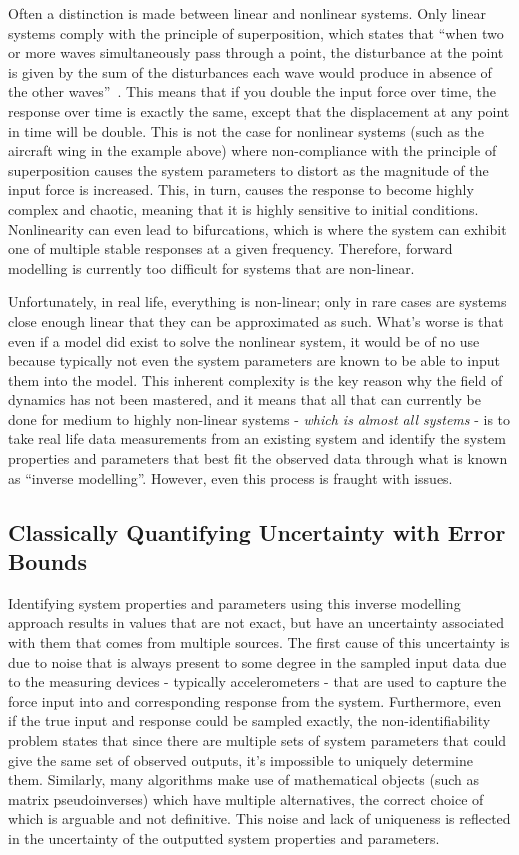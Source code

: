 \documentclass[12pt]{article}
\begin{document}
    Often a distinction is made between linear and nonlinear systems.
    Only linear systems comply with the principle of superposition, which states that ``when two or more waves simultaneously pass through a point, the disturbance at the point is given by the sum of the disturbances each wave would produce in absence of the other waves''~\cite{StudyComSuperposition}.
    This means that if you double the input force over time, the response over time is exactly the same, except that the displacement at any point in time will be double.
    This is not the case for nonlinear systems (such as the aircraft wing in the example above) where non-compliance with the principle of superposition causes the system parameters to distort as the magnitude of the input force is increased.
    This, in turn, causes the response to become highly complex and chaotic, meaning that it is highly sensitive to initial conditions.
    Nonlinearity can even lead to bifurcations, which is where the system can exhibit one of multiple stable responses at a given frequency.
    Therefore, forward modelling is currently too difficult for systems that are non-linear.

    Unfortunately, in real life, everything is non-linear;
    only in rare cases are systems close enough linear that they can be approximated as such.
    What's worse is that even if a model did exist to solve the nonlinear system, it would be of no use because typically not even the system parameters are known to be able to input them into the model.
    This inherent complexity is the key reason why the field of dynamics has not been mastered, and it means that all that can currently be done for medium to highly non-linear systems - \textit{which is almost all systems} - is to take real life data measurements from an existing system and identify the system properties and parameters that best fit the observed data through what is known as ``inverse modelling''.
    However, even this process is fraught with issues.

    \subsection{Classically Quantifying Uncertainty with Error Bounds}
    Identifying system properties and parameters using this inverse modelling approach results in values that are not exact, but have an uncertainty associated with them that comes from multiple sources.
    The first cause of this uncertainty is due to noise that is always present to some degree in the sampled input data due to the measuring devices - typically accelerometers - that are used to capture the force input into and corresponding response from the system.
    Furthermore, even if the true input and response could be sampled exactly, the non-identifiability problem states that since there are multiple sets of system parameters that could give the same set of observed outputs, it's impossible to uniquely determine them.
    Similarly, many algorithms make use of mathematical objects (such as matrix pseudoinverses) which have multiple alternatives, the correct choice of which is arguable and not definitive.
    This noise and lack of uniqueness is reflected in the uncertainty of the outputted system properties and parameters.
\end{document}
